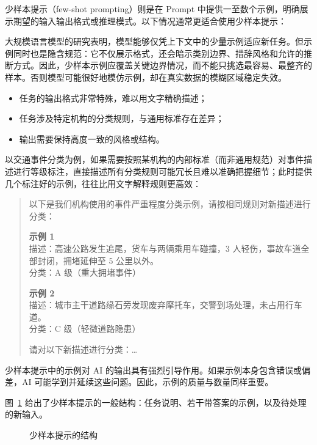 少样本提示（few-shot prompting）则是在 Prompt 中提供一至数个示例，明确展示期望的输入输出格式或推理模式。以下情况通常更适合使用少样本提示：

大规模语言模型的研究表明，模型能够仅凭上下文中的少量示例适应新任务\cite{brown2020language}。但示例同时也是隐含规范：它不仅展示格式，还会暗示类别边界、措辞风格和允许的推断方式。因此，少样本示例应覆盖关键边界情况，而不能只挑选最容易、最整齐的样本。否则模型可能很好地模仿示例，却在真实数据的模糊区域稳定失效。

\begin{itemize}
  \item 任务的输出格式非常特殊，难以用文字精确描述；
  \item 任务涉及特定机构的分类规则，与通用标准存在差异；
  \item 输出需要保持高度一致的风格或结构。
\end{itemize}

以交通事件分类为例，如果需要按照某机构的内部标准（而非通用规范）对事件描述进行等级标注，直接描述所有分类规则可能冗长且难以准确把握细节；此时提供几个标注好的示例，往往比用文字解释规则更高效：

\begin{quote}
以下是我们机构使用的事件严重程度分类示例，请按相同规则对新描述进行分类：

\smallskip
\textbf{示例 1}\\
描述：高速公路发生追尾，货车与两辆乘用车碰撞，3 人轻伤，事故车道全部封闭，拥堵延伸至 5 公里以外。\\
分类：A 级（重大拥堵事件）

\smallskip
\textbf{示例 2}\\
描述：城市主干道路缘石旁发现废弃摩托车，交警到场处理，未占用行车道。\\
分类：C 级（轻微道路隐患）

\smallskip
请对以下新描述进行分类：\ldots
\end{quote}

少样本提示中的示例对 AI 的输出具有强烈引导作用。如果示例本身包含错误或偏差，AI 可能学到并延续这些问题。因此，示例的质量与数量同样重要。

图~\ref{fig:ch02_fewshot} 给出了少样本提示的一般结构：任务说明、若干带答案的示例，以及待处理的新输入。

\begin{figure}[H]
  \centering
  \caption{少样本提示的结构}
  \label{fig:ch02_fewshot}
\end{figure}

